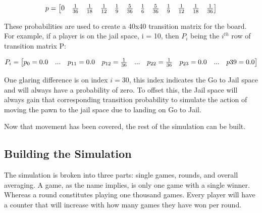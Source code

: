 \documentclass{article}
\begin{document}
$$
\setcounter{MaxMatrixCols}{20}
p=
\begin{bmatrix}
0&\frac{1}{36}&\frac{1}{18}&\frac{1}{12}&\frac{1}{9}&\frac{5}{36}&\frac{1}{6}&\frac{5}{36}&\frac{1}{9}&\frac{1}{12}&\frac{1}{18}&\frac{1}{36}\\
\end{bmatrix}
$$

These probabilities are used to create a 40x40 transition matrix for the board.  For example, if a player is on the jail space, i = 10,  then $P_i$ being the $i^{th}$ row of transition matrix P:

$$
\setcounter{MaxMatrixCols}{20}
P_i=
\begin{bmatrix}
p_0 = 0.0& ... & p_{11} = 0.0 & p_{12} = \frac{1}{36}&...& p_{22} = \frac{1}{36}& p_{23} = 0.0 & ... & p{39} = 0.0\\
\end{bmatrix}
$$

One glaring difference is on index $i = 30$, this index indicates the Go to Jail space and will always have a probability of zero.  To offset this, the Jail space will always gain that corresponding transition probability to simulate the action of moving the pawn to the jail space due to landing on Go to Jail.  

Now that movement has been covered, the rest of the simulation can be built.

\subsection{Building the Simulation}

The simulation is broken into three parts: single games, rounds, and overall averaging.  A game, as the name implies, is only one game with a single winner.  Whereas a round constitutes playing one thousand games.  Every player will have a counter that will increase with how many games they have won per round.
\end{document}

